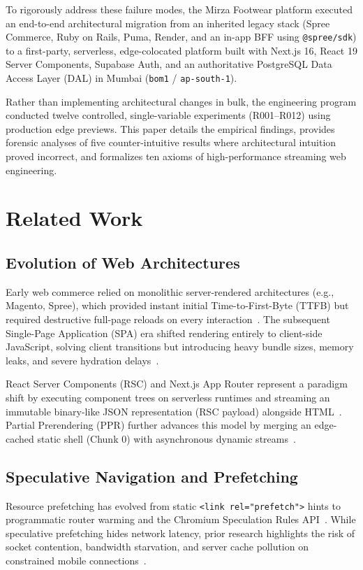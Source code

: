 \documentclass[conference]{IEEEtran}
\begin{document}
To rigorously address these failure modes, the Mirza Footwear platform executed an end-to-end architectural migration from an inherited legacy stack (Spree Commerce, Ruby on Rails, Puma, Render, and an in-app BFF using \texttt{@spree/sdk}) to a first-party, serverless, edge-colocated platform built with Next.js 16, React 19 Server Components, Supabase Auth, and an authoritative PostgreSQL Data Access Layer (DAL) in Mumbai (\texttt{bom1} / \texttt{ap-south-1}). 

Rather than implementing architectural changes in bulk, the engineering program conducted twelve controlled, single-variable experiments (R001--R012) using production edge previews. This paper details the empirical findings, provides forensic analyses of five counter-intuitive results where architectural intuition proved incorrect, and formalizes ten axioms of high-performance streaming web engineering.

\section{Related Work}
\subsection{Evolution of Web Architectures}
Early web commerce relied on monolithic server-rendered architectures (e.g., Magento, Spree), which provided instant initial Time-to-First-Byte (TTFB) but required destructive full-page reloads on every interaction~\cite{souders2009faster}. The subsequent Single-Page Application (SPA) era shifted rendering entirely to client-side JavaScript, solving client transitions but introducing heavy bundle sizes, memory leaks, and severe hydration delays~\cite{dombloat2023}.

React Server Components (RSC) and Next.js App Router represent a paradigm shift by executing component trees on serverless runtimes and streaming an immutable binary-like JSON representation (RSC payload) alongside HTML~\cite{react2024rsc}. Partial Prerendering (PPR) further advances this model by merging an edge-cached static shell (Chunk 0) with asynchronous dynamic streams~\cite{nextjs2025ppr}.

\subsection{Speculative Navigation and Prefetching}
Resource prefetching has evolved from static \texttt{<link rel="prefetch">} hints to programmatic router warming and the Chromium Speculation Rules API~\cite{wicg2024speculation}. While speculative prefetching hides network latency, prior research highlights the risk of socket contention, bandwidth starvation, and server cache pollution on constrained mobile connections~\cite{webprefetch2020}.
\end{document}
